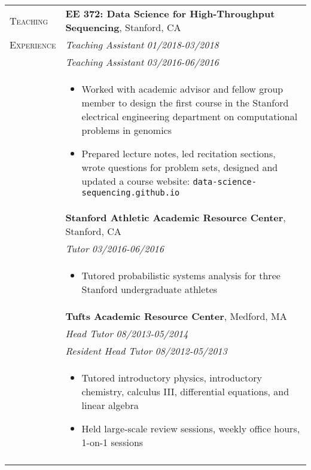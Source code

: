 \documentclass[letterpaper,11pt,oneside]{article}
\begin{document}
\begin{longtable}{@{} p{2.5cm} p{14.8cm}}
  \large{\textsc{Teaching}}  & \textbf{EE 372: Data Science for High-Throughput Sequencing}, Stanford, CA \\
  \large{\textsc{Experience}}  & \textit{Teaching Assistant} \hfill \textit{01/2018-03/2018}  \\ 
  & \textit{Teaching Assistant} \hfill \textit{03/2016-06/2016}  \\ 
& 
\vspace{-7mm}
\begin{itemize}[leftmargin=.5cm]
	\setlength\itemsep{-0.3em}
	\item Worked with academic advisor and fellow group member to design the first course in the Stanford electrical engineering department on computational problems in genomics
	\item Prepared lecture notes, led recitation sections, wrote questions for problem sets, designed and updated a course website: \texttt{data-science-sequencing.github.io}
\end{itemize} 
\\

& \textbf{Stanford Athletic Academic Resource Center}, Stanford, CA \\
& \textit{Tutor} \hfill \textit{03/2016-06/2016} \\ 
& 
\vspace{-7mm}
\begin{itemize}[leftmargin=.5cm]
	\setlength\itemsep{-0.3em}
	\item Tutored probabilistic systems analysis for three Stanford undergraduate athletes
\end{itemize} 
\\

& \textbf{Tufts Academic Resource Center}, Medford, MA \\*
& \textit{Head Tutor} \hfill \textit{08/2013-05/2014}  \\*
& \textit{Resident Head Tutor} \hfill \textit{08/2012-05/2013}  \\*
& 
\vspace{-7mm}
\begin{itemize}[leftmargin=.5cm]
	\setlength\itemsep{-0.3em}
	\item Tutored introductory physics, introductory chemistry, calculus III, differential equations, and linear algebra
	\item Held large-scale review sessions, weekly office hours, 1-on-1 sessions
\end{itemize} 
\\
& \\
     

\end{longtable}
\end{document}

